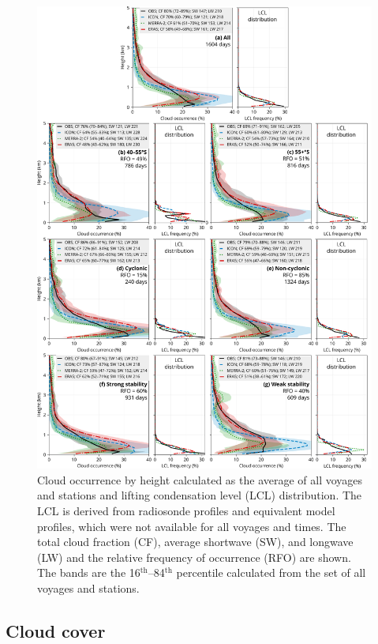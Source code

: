 \documentclass[12pt,a4paper]{article}
\begin{document}
\begin{figure}[p!]
\centering
\includegraphics[width=\textwidth]{img/cl_agg.pdf}
\caption{
Cloud occurrence by height calculated as the average of all voyages and
stations and lifting condensation level (LCL) distribution. The LCL is derived
from radiosonde profiles and equivalent model profiles, which were not
available for all voyages and times. The total cloud fraction (CF), average
shortwave (SW), and longwave (LW) and the relative frequency of occurrence
(RFO) are shown. The bands are the 16$^\mathrm{th}$--84$^\mathrm{th}$
percentile calculated from the set of all voyages and stations.
}
\label{fig:cloud-occurrence}
\end{figure}

\subsection{Cloud cover}
\label{sec:cloud-cover}
\end{document}
